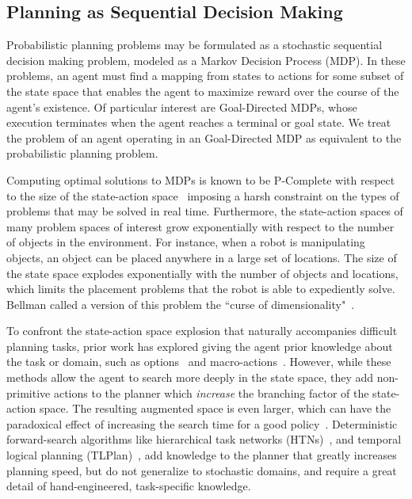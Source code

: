 \documentclass[11pt]{article}
\begin{document}
\subsection{Planning as Sequential Decision Making}
Probabilistic planning problems may be formulated as a stochastic sequential decision making problem, modeled as a Markov Decision Process (MDP). In these problems, an agent must find a mapping from states to actions for some subset of the state space that enables the agent to maximize reward over the course of the agent's existence. Of particular interest are Goal-Directed MDPs, whose execution terminates when the agent reaches a terminal or goal state. We treat the problem of an agent operating in an Goal-Directed MDP as equivalent to the probabilistic planning problem.

Computing optimal solutions to MDPs is known to be P-Complete with respect to the size of the state-action space~\cite{papadimitriou1987complexity} imposing a harsh constraint on the types of problems that may be solved in real time. Furthermore, the state-action spaces of many problem spaces of interest grow exponentially with respect to the number of objects in the environment.  For instance, when a robot is manipulating objects, an object can be placed anywhere in a large set of locations.  The size of the state space explodes exponentially with the number of objects and locations, which limits the placement problems that the robot is able to expediently solve. Bellman called a version of this problem the ``curse of dimensionality"~\cite{bellman1961adaptive}.

To confront the state-action space explosion that naturally accompanies difficult planning tasks, prior work has explored giving the agent prior knowledge about the task or domain, such as options~\cite{sutton99} and macro-actions~\cite{Botea:2005kx,Newton:2005vn}.  However, while these methods allow the agent to search more deeply in the state space, they add non-primitive actions to the planner which {\em increase} the branching factor of the state-action space.  The resulting augmented space is even larger, which can have the paradoxical effect of increasing the search time for a good policy~\cite{Jong:2008zr}. Deterministic forward-search algorithms like hierarchical task networks (HTNs)~\cite{Nau:1999:SSH:1624312.1624357}, and temporal logical planning (TLPlan)~\cite{Bacchus95usingtemporal,Bacchus99usingtemporal}, add knowledge to the planner that greatly increases planning speed, but do not generalize to stochastic domains, and require a great detail of hand-engineered, task-specific knowledge.
\end{document}
